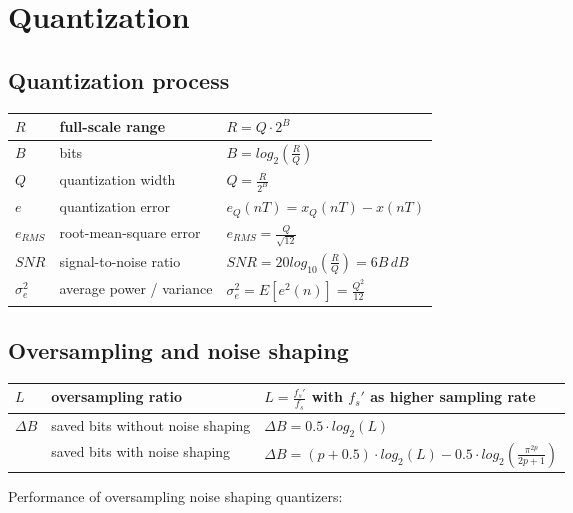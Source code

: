 \section{Quantization}

\subsection{Quantization process}
\begin{tabularx}{0.75\textwidth}{|l|X|X|}
	\hline
	$R$			& full-scale range		& $R = Q \cdot 2^B$
	\\ \hline
	$B$			& bits					& $B = log_2 \left(\frac{R}{Q}\right)$
	\\ \hline
	$Q$			& quantization width	& $Q = \frac{R}{2^B}$
	\\ \hline
	$e$			& quantization error	& $e_Q(nT) = x_Q(nT) -x(nT)$
	\\ \hline
	$e_{RMS}$	& root-mean-square error & $e_{RMS} = \frac{Q}{\sqrt{12}}$
	\\ \hline
	$SNR$		& signal-to-noise ratio	& $SNR = 20 log_{10}\left(\frac{R}{Q}\right) = 6B\, dB$
	\\ \hline
	$\sigma_e^2$& average power / variance & $\sigma_e^2 = E[e^2(n)] = \frac{Q^2}{12}$
	\\ \hline
\end{tabularx}


\subsection{Oversampling and noise shaping}
\begin{tabularx}{0.75\textwidth}{|l|l|X|}
	\hline
	$L$	& oversampling ratio	& $L = \frac{f_s'}{f_s}$ with $f_s'$ as higher sampling rate
	\\ \hline
	$\Delta B$	& saved bits without noise shaping	& $\Delta B = 0.5 \cdot log_2(L)$ \\
				& saved bits with noise shaping		& $\Delta B = (p + 0.5) \cdot log_2(L) - 0.5 \cdot log_2\left(\frac{\pi^{2p}}{2p + 1}\right)$
	\\ \hline
\end{tabularx}

Performance of oversampling noise shaping quantizers:

